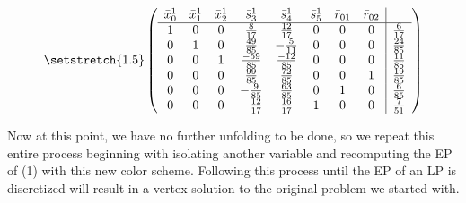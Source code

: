 \documentclass[11pt]{article} %
\begin{document}
	\begin{equation}\setstretch{1.5}
	\begin{pmatrix}
		\begin{array}{cccccccc|c}
			\bar{x}^1_0 & \bar{x}^1_1 & \bar{x}^1_2 & \bar{s}^1_3 & \bar{s}^1_4 & \bar{s}^1_5 & \bar{r}_{01} & \bar{r}_{02} \\
			\hline
			1 & 0 & 0 & \frac{8}{17} & \frac{12}{17} & 0 & 0 & 0 & \frac{6}{17} \\ 
			0 & 1 & 0 & \frac{49}{85} & -\frac{5}{11} & 0 &  0 & 0 & \frac{24}{85} \\ 
			0 & 0 & 1 & \frac{-59}{85} & \frac{-12}{85} & 0 & 0 & 0 & \frac{11}{85} \\ 
			0 & 0 & 0 & \frac{99}{85} & \frac{72}{85} & 0 & 0 & 1 & \frac{19}{85} \\ 
			0 & 0 & 0 & -\frac{9}{85} & \frac{63}{85} & 0 & 1 & 0 & \frac{6}{85} \\
			0 & 0 & 0 & -\frac{12}{17} & \frac{16}{17} & 1 & 0 & 0 & \frac{7}{51} \\
		\end{array}
	\end{pmatrix}
\end{equation}

Now at this point, we have no further unfolding to be done, so we repeat this entire process beginning with isolating another variable and recomputing the EP of (1) with this new color scheme.  Following this process until the EP of an LP is discretized will result in a vertex solution to the original problem we started with.
	
 
\end{document}
